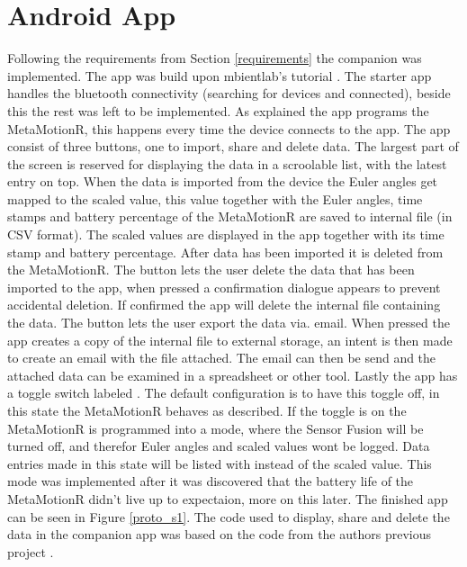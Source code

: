 \section{Android App}
Following the requirements from Section \ref{requirements} the companion was implemented. The app was build upon mbientlab's tutorial \cite{starter_mbient}. The starter app handles the bluetooth connectivity (searching for devices and connected), beside this the rest was left to be implemented. As explained the app programs the MetaMotionR, this happens every time the device connects to the app. The app consist of three buttons, one to import, share and delete data. The largest part of the screen is reserved for displaying the data in a scroolable list, with the latest entry on top. When the data is imported from the device the Euler angles get mapped to the scaled value, this value together with the Euler angles, time stamps and battery percentage of the MetaMotionR are saved to internal file (in CSV format). The scaled values are displayed in the app together with its time stamp and battery percentage. After data has been imported it is deleted from the MetaMotionR. The  button lets the user delete the data that has been imported to the app, when pressed a confirmation dialogue appears to prevent accidental deletion. If confirmed the app will delete the internal file containing the data. The  button lets the user export the data via. email. When pressed the app creates a copy of the internal file to external storage, an intent is then made to create an email with the file attached. The email can then be send and the attached data can be examined in a spreadsheet or other tool. Lastly the app has a toggle switch labeled . The default configuration is to have this toggle off, in this state the MetaMotionR behaves as described. If the toggle is on the MetaMotionR is programmed into a  mode, where the Sensor Fusion will be turned off, and therefor Euler angles and scaled values wont be logged. Data entries made in this state will be listed with \say{--} instead of the scaled value. This mode was implemented after it was discovered that the battery life of the MetaMotionR didn't live up to expectaion, more on this later. The finished app can be seen in Figure \ref{proto_s1}. The code used to display, share and delete the data in the companion app was based on the code from the authors previous project \cite{mood}.

